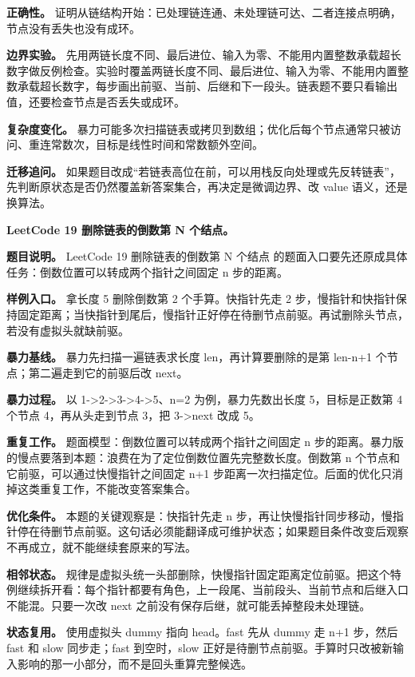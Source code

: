 \textbf{正确性。} 证明从链结构开始：已处理链连通、未处理链可达、二者连接点明确，节点没有丢失也没有成环。

\textbf{边界实验。} 先用两链长度不同、最后进位、输入为零、不能用内置整数承载超长数字做反例检查。实验时覆盖两链长度不同、最后进位、输入为零、不能用内置整数承载超长数字，每步画出前驱、当前、后继和下一段头。链表题不要只看输出值，还要检查节点是否丢失或成环。

\textbf{复杂度变化。} 暴力可能多次扫描链表或拷贝到数组；优化后每个节点通常只被访问、重连常数次，目标是线性时间和常数额外空间。

\textbf{迁移追问。} 如果题目改成“若链表高位在前，可以用栈反向处理或先反转链表”，先判断原状态是否仍然覆盖新答案集合，再决定是微调边界、改 value 语义，还是换算法。

\noindent\textbf{LeetCode 19 删除链表的倒数第 N 个结点。}

\textbf{题目说明。} LeetCode 19 删除链表的倒数第 N 个结点 的题面入口要先还原成具体任务：倒数位置可以转成两个指针之间固定 n 步的距离。

\textbf{样例入口。} 拿长度 5 删除倒数第 2 个手算。快指针先走 2 步，慢指针和快指针保持固定距离；当快指针到尾后，慢指针正好停在待删节点前驱。再试删除头节点，若没有虚拟头就缺前驱。

\textbf{暴力基线。} 暴力先扫描一遍链表求长度 len，再计算要删除的是第 len-n+1 个节点；第二遍走到它的前驱后改 next。

\textbf{暴力过程。} 以 1->2->3->4->5、n=2 为例，暴力先数出长度 5，目标是正数第 4 个节点 4，再从头走到节点 3，把 3->next 改成 5。

\textbf{重复工作。} 题面模型：倒数位置可以转成两个指针之间固定 n 步的距离。暴力版的慢点要落到本题：浪费在为了定位倒数位置先完整数长度。倒数第 n 个节点和它前驱，可以通过快慢指针之间固定 n+1 步距离一次扫描定位。后面的优化只消掉这类重复工作，不能改变答案集合。

\textbf{优化条件。} 本题的关键观察是：快指针先走 n 步，再让快慢指针同步移动，慢指针停在待删节点前驱。这句话必须能翻译成可维护状态；如果题目条件改变后观察不再成立，就不能继续套原来的写法。

\textbf{相邻状态。} 规律是虚拟头统一头部删除，快慢指针固定距离定位前驱。把这个特例继续拆开看：每个指针都要有角色，上一段尾、当前段头、当前节点和后继入口不能混。只要一次改 next 之前没有保存后继，就可能丢掉整段未处理链。

\textbf{状态复用。} 使用虚拟头 dummy 指向 head。fast 先从 dummy 走 n+1 步，然后 fast 和 slow 同步走；fast 到空时，slow 正好是待删节点前驱。手算时只改被新输入影响的那一小部分，而不是回头重算完整候选。

